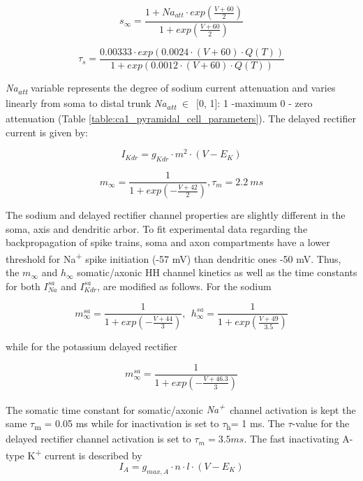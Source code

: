 \documentclass[a4paper,12pt]{article}
\begin{document}
\begin{equation}
s_{\infty}=\frac{1+Na_{att}\cdot exp(\frac{V+60}{2})}{1+exp(\frac{V+60}{2})}
\end{equation}


\begin{equation}
\tau_s=\frac{0.00333\cdot  exp(0.0024 \cdot (V+60)\cdot
		Q(T))}{1+exp(0.0012 \cdot (V+60)\cdot Q(T))}
\end{equation}

\textit{Na\textsubscript{att}} variable represents the degree of sodium current
attenuation and varies linearly from soma to distal trunk
\textit{Na\textsubscript{att}} $\in$~[0, 1]: 1 -maximum 0 - zero attenuation (Table \ref{table:ca1_pyramidal_cell_parameters}). The delayed rectifier current is given by:

\begin{equation}
I_{Kdr} = g_{Kdr} \cdot m^2 \cdot (V-E_K)
\end{equation}

\begin{equation}
m_{\infty}=\frac{1}{1+exp(-\frac{V+42}{2})}, \tau_m = 2.2 \ ms
\end{equation}

The sodium and delayed rectifier channel properties are slightly different in the soma, axis and dendritic arbor. To fit
experimental data regarding the backpropagation of spike trains, soma and axon compartments have a lower threshold for
Na\textsuperscript{+} spike initiation (-57 mV) than dendritic ones -50 mV. Thus, the $m_{\infty}$ and $h_{\infty}$
somatic/axonic HH channel kinetics as well as the time constants for both $I_{Na}^{sa}$ and $I_{Kdr}^{sa}$, are modified as follows. For the sodium

\begin{equation}
m_{\infty}^{sa}=\frac {1}{1+exp(-\frac{V+44}{3})} ,\ \ 
h_{\infty}^{sa}=\frac {1}{1+exp(\frac{V+49}{3.5})}
\end{equation}

while for the potassium delayed rectifier

\begin{equation}
m_{\infty}^{sa}=\frac {1}{1+exp(-\frac{V+46.3}{3})}
\end{equation}

The somatic time constant for somatic/axonic \textit{Na}\textit{\textsuperscript{+}}~channel activation is kept the
same $\tau$\textsubscript{m} = 0.05 ms while for inactivation is set to $\tau$\textsubscript{h}= 1 ms. The $\tau$-value for the delayed rectifier channel activation is set to $\tau_{m}= 3.5 ms$.
The fast inactivating A-type K\textsuperscript{+ }current is described by
\begin{equation}
I_A = g_{max, A} \cdot n \cdot l \cdot (V - E_K)
\end{equation}
\end{document}
